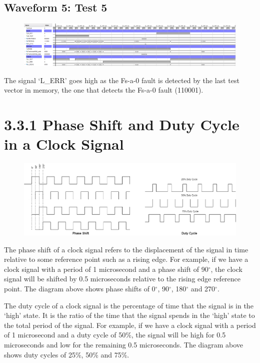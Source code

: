 \documentclass[11pt]{report}
\begin{document}
\subsection*{Waveform 5: Test 5}
\begin{figure}[H]
    \includegraphics[width=\columnwidth]{Assets/3.2.3_test5.png}
\end{figure}

The signal `L\_ERR' goes high as the Fs-a-0 fault is detected by the last test vector in memory, the one that detects the Fs-a-0 fault (110001).


\section*{3.3.1 Phase Shift and Duty Cycle in a Clock Signal}
\begin{figure}[H]
    \includegraphics[width=\columnwidth]{Assets/3.3.1_diagrams.png}
\end{figure}

The phase shift of a clock signal refers to the displacement of the signal in time relative to some reference point such as a rising edge. For example, if we have a clock signal with a period of 1 microsecond and a phase shift of 90$^{\circ}$, the clock signal will be shifted by 0.5 microseconds relative to the rising edge reference point. The diagram above shows phase shifts of 0$^{\circ}$, 90$^{\circ}$, 180$^{\circ}$ and 270$^{\circ}$.

The duty cycle of a clock signal is the percentage of time that the signal is in the `high' state. It is the ratio of the time that the signal spends in the `high' state to the total period of the signal. For example, if we have a clock signal with a period of 1 microsecond and a duty cycle of 50\%, the signal will be high for 0.5 microseconds and low for the remaining 0.5 microseconds. The diagram above shows duty cycles of 25\%, 50\% and 75\%.
\end{document}
